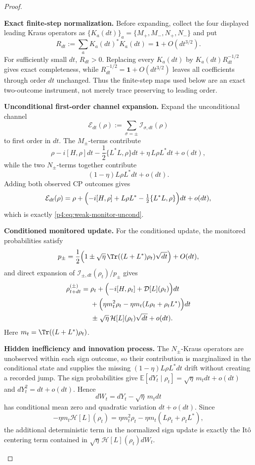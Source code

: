 \documentclass[12pt,a4paper]{article}
\begin{document}
\begin{proof}
\begin{proofsteps}

\item \textbf{Exact finite-step normalization.}
Before expanding, collect the four displayed leading Kraus operators as
\(\{K_a(dt)\}_a=\{M_+,M_-,N_+,N_-\}\) and put
\[
R_{dt}:=\sum_a K_a(dt)^*K_a(dt)
=\mathbf1+O(dt^{3/2}).
\]
For sufficiently small \(dt\), \(R_{dt}>0\).  Replacing every \(K_a(dt)\)
by \(K_a(dt)R_{dt}^{-1/2}\) gives exact completeness, while
\(R_{dt}^{-1/2}=\mathbf1+O(dt^{3/2})\) leaves all coefficients through order
\(dt\) unchanged.  Thus the finite-step maps used below are an exact
two-outcome instrument, not merely trace preserving to leading order.

\item \textbf{Unconditional first-order channel expansion.}
Expand the unconditional channel
\[
\mathcal E_{dt}(\rho)
:=\sum_{\sigma=\pm}\mathcal I_{\sigma,dt}(\rho)
\]
to first order in \(dt\).
The \(M_\pm\)-terms contribute
\[
\rho-i[H,\rho]dt-\frac12\{L^*L,\rho\}dt+\eta\,L\rho L^*dt+o(dt),
\]
while the two \(N_\pm\)-terms together contribute
\[
(1-\eta)L\rho L^*dt+o(dt).
\]
Adding both observed CP outcomes gives
\[
\mathcal E_{dt}(\rho)
=
\rho+\Bigl(-i[H,\rho]+L\rho L^*-\tfrac12\{L^*L,\rho\}\Bigr)dt+o(dt),
\]
which is exactly \eqref{p4:eq:weak-monitor-uncond}.


\item \textbf{Conditioned monitored update.}
For the conditioned update, the monitored probabilities satisfy
\[
p_\pm
=
\frac12\Bigl(1\pm \sqrt{\eta}\,\Tr((L+L^*)\rho_t)\sqrt{dt}\Bigr)+O(dt),
\]
and direct expansion of
\(\mathcal I_{\pm,dt}(\rho_t)/p_\pm\) gives
\[
\begin{aligned}
\rho_{t+dt}^{(\pm)}
={}&
\rho_t
+\Bigl(-i[H,\rho_t]+\mathcal D[L](\rho_t)\Bigr)dt\\
&+\Bigl(\eta m_t^2\rho_t
-\eta m_t(L\rho_t+\rho_tL^*)\Bigr)dt\\
&\mathrel{\pm}
\sqrt{\eta}\,\mathcal H[L](\rho_t)\sqrt{dt}
+o(dt).
\end{aligned}
\]
Here \(m_t=\Tr((L+L^*)\rho_t)\).

\item \textbf{Hidden inefficiency and innovation process.}
The \(N_\pm\)-Kraus operators are unobserved within each sign outcome, so
their contribution is marginalized in the conditional state and supplies
the missing \((1-\eta)L\rho L^*dt\) drift without creating a recorded jump.
The sign probabilities give
\(\mathbb E[dY_t\mid\rho_t]=\sqrt{\eta}\,m_tdt+o(dt)\) and
\(dY_t^2=dt+o(dt)\).  Hence
\[
dW_t=dY_t-\sqrt\eta\,m_tdt
\]
has conditional mean zero and quadratic variation \(dt+o(dt)\).  Since
\[
-\eta m_t\mathcal H[L](\rho_t)
=\eta m_t^2\rho_t-\eta m_t(L\rho_t+\rho_tL^*),
\]
the additional deterministic term in the normalized sign update is exactly
the It\^o centering term contained in
\(\sqrt\eta\,\mathcal H[L](\rho_t)dW_t\).


\end{proofsteps}
\end{proof}
\end{document}
